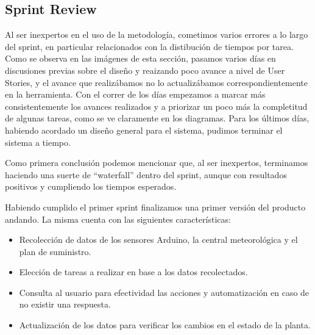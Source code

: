 \subsection{Sprint Review}
Al ser inexpertos en el uso de la metodología, cometimos varios errores a lo largo del sprint, en particular relacionados con la distibución de tiempos por tarea. Como se observa en las imágenes de esta sección, pasamos varios días en discusiones previas sobre el diseño y reaizando poco avance a nivel de User Stories, y el avance que realizábamos no lo actualizábamos correspondientemente en la herramienta.
Con el correr de los días empezamos a marcar más consistentemente los avances realizados y a priorizar un poco más la completitud de algunas tareas, como se ve claramente en los diagramas. Para los últimos días, habiendo acordado un diseño general para el sistema, pudimos terminar el sistema a tiempo.

Como primera conclusión podemos mencionar que, al ser inexpertos, terminamos haciendo una suerte de ``waterfall'' dentro del sprint, aunque con resultados positivos y cumpliendo los tiempos esperados.

Habiendo cumplido el primer sprint finalizamos una primer versión del producto andando. 
La misma cuenta con las siguientes características:
\begin{itemize}
\item Recolección de datos de los sensores Arduino, la central meteorológica y el plan de suministro.
\item Elección de tareas a realizar en base a los datos recolectados.
\item Consulta al usuario para efectividad las acciones y automatización en caso de no existir una respuesta.
\item Actualización de los datos para verificar los cambios en el estado de la planta.
\end{itemize}

